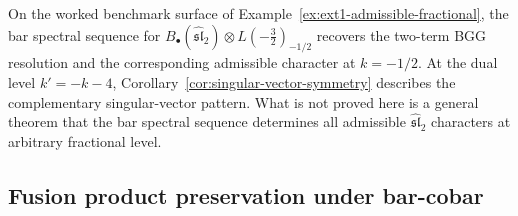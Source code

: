 \begin{remark}
\label{rem:admissible-bar-ss}
On the worked benchmark surface of
Example~\ref{ex:ext1-admissible-fractional}, the bar spectral
sequence for
$B_\bullet(\widehat{\mathfrak{sl}}_2) \otimes
L(-\tfrac{3}{2})_{-1/2}$ recovers the two-term BGG resolution and
the corresponding admissible character at $k=-1/2$. At the dual
level $k' = -k - 4$, Corollary~\ref{cor:singular-vector-symmetry}
describes the complementary singular-vector pattern. What is not
proved here is a general theorem that the bar spectral sequence
determines all admissible $\widehat{\mathfrak{sl}}_2$ characters at
arbitrary fractional level.
\end{remark}

\subsection{Fusion product preservation under bar-cobar}
\label{subsec:fusion-bar-cobar}

